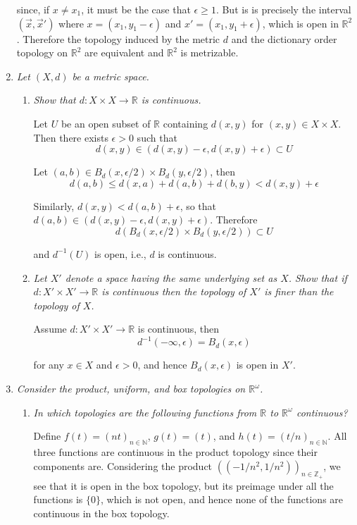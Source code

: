 \documentclass[10pt]{article}
\newcommand{\N}{\mathbb{N}}
\newcommand{\Z}{\mathbb{Z}}
\newcommand{\R}{\mathbb{R}}
\begin{document}
\begin{enumerate}
since, if $x \neq x_1$, it must be the case that $\epsilon \geq 1$.  But is is precisely the interval $(\vec{x}, \vec{x}')$ where $x = (x_1, y_1 - \epsilon)$ and $x' = (x_1, y_1 + \epsilon)$, which is open in $\R^2$.  Therefore the topology induced by the metric $d$ and the dictionary order topology on $\R^2$ are equivalent and $\R^2$ is metrizable.

\item \emph{Let $(X,d)$ be a metric space.}
\begin{enumerate}
\item \emph{Show that $d: X \times X \rightarrow \R$ is continuous.}

Let $U$ be an open subset of $\R$ containing $d(x,y)$ for $(x,y) \in X \times X$.  Then there exists $\epsilon > 0$ such that
\[
d(x,y) \in (d(x,y) - \epsilon, d(x,y) + \epsilon) \subset U
\]

Let $(a,b) \in B_d(x, \epsilon/2) \times B_d(y, \epsilon/2)$, then
\[
d(a,b) \leq d(x,a) + d(a,b) + d(b,y) < d(x,y) + \epsilon
\]

Similarly, $d(x,y) < d(a,b) + \epsilon$, so that $d(a,b) \in (d(x,y) - \epsilon, d(x,y) + \epsilon)$.  Therefore
\[
d(B_d(x, \epsilon/2) \times B_d(y, \epsilon/2)) \subset U
\]

and $d^{-1}(U)$ is open, i.e., $d$ is continuous.

\item \emph{Let $X'$ denote a space having the same underlying set as $X$.  Show that if $d: X' \times X' \rightarrow \R$ is continuous then the topology of $X'$ is finer than the topology of $X$.}

Assume $d: X' \times X' \rightarrow \R$ is continuous, then
\[
d^{-1}(-\infty, \epsilon) = B_d(x, \epsilon)
\]

for any $x \in X$ and $\epsilon > 0$, and hence $B_d(x, \epsilon)$ is open in $X'$.

\end{enumerate}

\item \emph{Consider the product, uniform, and box topologies on $\R^\omega$.}
\begin{enumerate}
\item \emph{In which topologies are the following functions from $\R$ to $\R^\omega$ continuous?}

Define $f(t) = (nt)_{n \in \N}$, $g(t) = (t)$, and $h(t) = (t/n)_{n \in \N}$.  All three functions are continuous in the product topology since their components are.  Considering the product $((-1/n^2, 1/n^2))_{n \in \Z_+}$, we see that it is open in the box topology, but its preimage under all the functions is $\{0\}$, which is not open, and hence none of the functions are continuous in the box topology.


\end{enumerate}
\end{enumerate}
\end{document}
